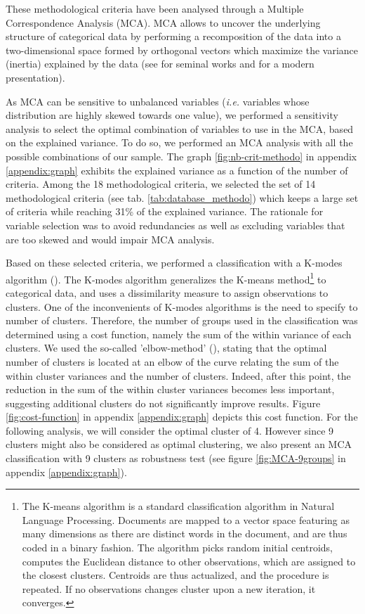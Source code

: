 These methodological criteria have been analysed through a Multiple Correspondence Analysis (MCA). MCA allows to uncover the underlying structure of categorical data by performing a recomposition of the data into a two-dimensional space formed by orthogonal vectors which maximize the variance (inertia) explained by the data (see \cite{Benzecri} for seminal works and \cite{LeRoux_Rouanet} for a modern presentation).

As MCA can be sensitive to unbalanced variables (\textit{i.e.} variables whose distribution are highly skewed towards one value), we performed a sensitivity analysis to select the optimal combination of variables to use in the MCA, based on the explained variance. To do so, we performed an MCA analysis with all the possible combinations of our sample.
The graph \ref{fig:nb-crit-methodo} in appendix \ref{appendix:graph} exhibits the explained variance as a function of the number of criteria. Among the 18 methodological criteria, we selected the set of 14 methodological criteria (see tab. \ref{tab:database_methodo}) which keeps a large set of criteria  while reaching 31\% of the explained variance. The rationale for variable selection was to avoid redundancies as well as excluding variables that are too skewed and would impair MCA analysis. 
%

Based on these selected criteria, we performed a classification with a K-modes algorithm (\cite{Huang1998}). The K-modes algorithm generalizes the K-means method\footnote{ The K-means algorithm \citep{mcqueen1967,Lloyd1982} is a standard classification algorithm in Natural Language Processing. Documents are mapped to a vector space featuring as many dimensions as there are distinct words in the document, and are thus coded in a binary fashion. The algorithm picks random initial centroids, computes the Euclidean distance to other observations, which are assigned to the closest clusters. Centroids are thus actualized, and the procedure is repeated. If no observations changes cluster upon a new iteration, it converges.} to categorical data, and uses a dissimilarity measure to assign observations to clusters. One of the inconvenients of K-modes algorithms is the need to specify to number of clusters. Therefore, the number of groups used in the classification was determined using a cost function, namely the sum of the within variance of each clusters. We used the so-called 'elbow-method' (\cite{Ketchen1998}), stating that the optimal number of clusters is located at an elbow of the curve relating the sum of the within cluster variances and the number of clusters. Indeed, after this point, the reduction in the sum of the within cluster variances becomes less important, suggesting additional clusters do not significantly improve results. Figure \ref{fig:cost-function} in appendix \ref{appendix:graph} depicts this cost function. For the following analysis, we will consider the optimal cluster of 4. However since 9 clusters might also be considered as optimal clustering, we also present an MCA classification with 9 clusters as robustness test (see figure \ref{fig:MCA-9groups} in appendix \ref{appendix:graph}). 


